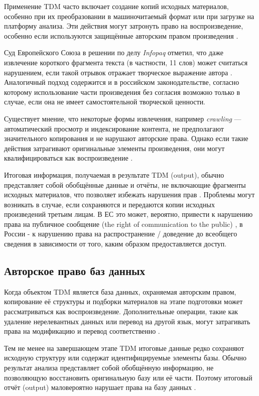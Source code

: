 Применение TDM часто включает создание копий исходных материалов, особенно при
их преобразовании в машиночитаемый формат или при загрузке на платформу
анализа. Эти действия могут затронуть право на воспроизведение, особенно если
используются защищённые авторским правом произведения \cite{geiger2020tdm}.

Суд Европейского Союза в решении по делу \textit{Infopaq} отметил, что даже
извлечение короткого фрагмента текста (в частности, 11 слов) может считаться
нарушением, если такой отрывок отражает творческое выражение автора
\cite{infopaq2009}. Аналогичный подход содержится и в российском
законодательстве, согласно которому использование части произведения без
согласия возможно только в случае, если она не имеет самостоятельной творческой
ценности.

Существует мнение, что некоторые формы извлечения, например \textit{crawling} —
автоматический просмотр и индексирование контента, не предполагают
значительного копирования и не нарушают авторские права. Однако если такие
действия затрагивают оригинальные элементы произведения, они могут
квалифицироваться как воспроизведение \cite{muto2016}.

Итоговая информация, получаемая в результате TDM (output), обычно представляет
собой обобщённые данные и отчёты, не включающие фрагменты исходных материалов,
что позволяет избежать нарушения прав \cite{triaille2014tdm}. Проблемы могут
возникать в случае, если сохраняются и передаются копии исходных произведений
третьим лицам. В ЕС это может, вероятно, привести к нарушению права на
публичное сообщение (the right of communication to the public)
\cite{geiger2020tdm}, в России - к нарушению права на распространение /
доведение до всеобщего сведения в зависимости от того, каким образом
предоставляется доступ.

\subsection*{Авторское право баз данных}

Когда объектом TDM является база данных, охраняемая авторским правом,
копирование её структуры и подборки материалов на этапе подготовки может
рассматриваться как воспроизведение. Дополнительные операции, такие как
удаление нерелевантных данных или перевод на другой язык, могут затрагивать
права на модификацию и перевод соответственно \cite{triaille2014tdm}.

Тем не менее на завершающем этапе TDM итоговые данные редко сохраняют исходную
структуру или содержат идентифицируемые элементы базы. Обычно результат анализа
представляет собой обобщённую информацию, не позволяющую восстановить
оригинальную базу или её части. Поэтому итоговый отчёт (output) маловероятно
нарушает права на базу данных \cite{muto2016, triaille2014tdm}.


